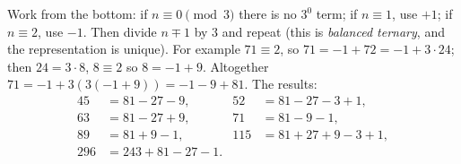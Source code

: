 Work from the bottom: if $n\equiv0\pmod3$ there is no $3^0$ term; if $n\equiv1$, use $+1$; if $n\equiv2$, use $-1$. Then divide $n\mp1$ by $3$ and repeat (this is \emph{balanced ternary}, and the representation is unique). For example $71\equiv2$, so $71=-1+72=-1+3\cdot24$; then $24=3\cdot8$, $8\equiv2$ so $8=-1+9$. Altogether $71=-1+3(3(-1+9))=-1-9+81$. The results:
\begin{align*}
45&=81-27-9, & 52&=81-27-3+1,\\
63&=81-27+9, & 71&=81-9-1,\\
89&=81+9-1, & 115&=81+27+9-3+1,\\
296&=243+81-27-1. &&
\end{align*}
